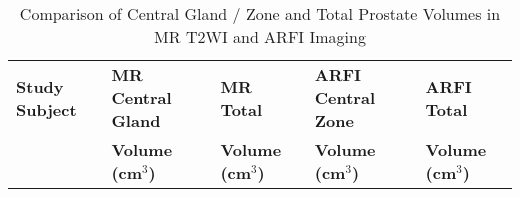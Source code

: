 \begin{table}
\centering
\caption{Comparison of Central Gland / Zone and Total Prostate Volumes in MR T2WI and ARFI Imaging}
\begin{tabular}{|l|l|l|l|l|} \hline
{\bf Study Subject} & {\bf MR Central Gland} & {\bf MR Total} & {\bf ARFI Central Zone} & {\bf ARFI Total} \\ 
& {\bf Volume (cm$^3$)} & {\bf Volume (cm$^3$)} & {\bf Volume (cm$^3$)} & {\bf Volume (cm$^3$)} \\ \hline

\hline
\end{tabular}
\label{tab:mr_arfi_volumes}
\end{table}
